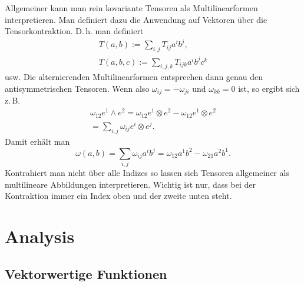\documentclass[a4paper,11pt,fleqn,twocolumn,twoside]{scrartcl}
\numberwithin{equation}{section}
\begin{document}
Allgemeiner kann man rein kovariante Tensoren als Multilinearformen
interpretieren. Man definiert dazu die Anwendung auf Vektoren über die
Tensorkontraktion. D.\,h. man definiert%
\begin{gather*}
T(a,b) := \sum_{i,j} T_{ij}a^ib^j,\\
T(a,b,c) := \sum_{i,j,k} T_{ijk}a^ib^jc^k
\end{gather*}
usw. Die alternierenden Multilinearformen entsprechen dann genau
den antisymmetrischen Tensoren. Wenn also $\omega_{ij}=-\omega_{ji}$
und $\omega_{kk}=0$ ist, so ergibt sich z.\,B.%
\begin{gather*}
\omega_{12}e^1\wedge e^2
= \omega_{12}e^1\otimes e^2-\omega_{12}e^1\otimes e^2\\
= \sum_{i,j}\omega_{ij}e^i\otimes e^j.
\end{gather*}
Damit erhält man
\begin{equation}
\omega(a,b) = \sum_{i,j}\omega_{ij}a^ib^j
= \omega_{12}a^1b^2-\omega_{21}a^2b^1.
\end{equation}
Kontrahiert man nicht über alle Indizes so lassen sich Tensoren
allgemeiner als multilineare Abbildungen interpretieren. Wichtig ist
nur, dass bei der Kontraktion immer ein Index oben und der zweite
unten steht.

\section{Analysis}
\subsection{Vektorwertige Funktionen}
\end{document}
